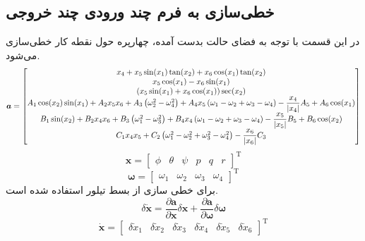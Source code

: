 \subsection{خطی‌سازی به فرم چند ورودی چند خروجی}\label{lin_MIMO}
در این قسمت با توجه به فضای حالت بدست آمده، چهارپره حول نقطه کار خطی‌سازی می‌شود.
\begin{equation*}
	\sloppy
	\boldsymbol a = \begin{bmatrix}
		x_4 + x_5\sin(x_1)\tan(x_2) + x_6\cos(x_1)\tan(x_2)\\
		x_5\cos(x_1)- x_6\sin(x_1)\\
		(x_5\sin(x_1) + x_6\cos(x_1))\sec(x_2)\\
		A_1\cos(x_2)\sin(x_1) + 
		A_2x_5x_6 + A_3\left(\omega_2^2-\omega_4^2\right)+
		A_4x_5\left(\omega_1-\omega_2+\omega_3-\omega_4\right)- \dfrac{x_4}{\lvert x_4\rvert}A_5+A_6\cos(x_1)\\
		B_1\sin(x_2) + 
		B_2x_4x_6 + B_3\left(\omega_1^2-\omega_3^2\right)+
		B_4x_4\left(\omega_1-\omega_2+\omega_3-\omega_4\right)- \dfrac{x_5}{\lvert x_5\rvert}B_5 + B_6\cos(x_2)\\
		C_1x_4x_5 + 
		C_2\left(\omega_1^2-\omega_2^2+\omega_3^2-\omega_4^2\right)- \dfrac{x_6}{\lvert x_6\rvert}C_3
	\end{bmatrix}
\end{equation*} 
\begin{equation}
	\boldsymbol{x} = \begin{bmatrix} %
		\phi& \theta & \psi & p& q& r
	\end{bmatrix}^\mathrm{T}
\end{equation}
\begin{equation}
	\boldsymbol{\omega} = \begin{bmatrix}
		\omega_1&\omega_2&\omega_3&\omega_4
	\end{bmatrix}^\mathrm{T}
\end{equation}
برای خطی سازی از بسط تیلور استفاده شده ‌است.
\begin{equation}
	\delta \dot{\boldsymbol{x}} = \dfrac{\partial  \boldsymbol a}{\partial  \boldsymbol x}\delta \boldsymbol x + \dfrac{\partial \boldsymbol a}{\partial \boldsymbol \omega}\delta \boldsymbol \omega 
\end{equation}
\begin{equation}
	\dot{\boldsymbol{x}} =
	\begin{bmatrix}
		\delta \dot x_1&
		\delta \dot x_2&
		\delta \dot x_3&
		\delta \dot x_4&
		\delta \dot x_5&
		\delta \dot x_6
	\end{bmatrix}^\mathrm{T}
\end{equation}

